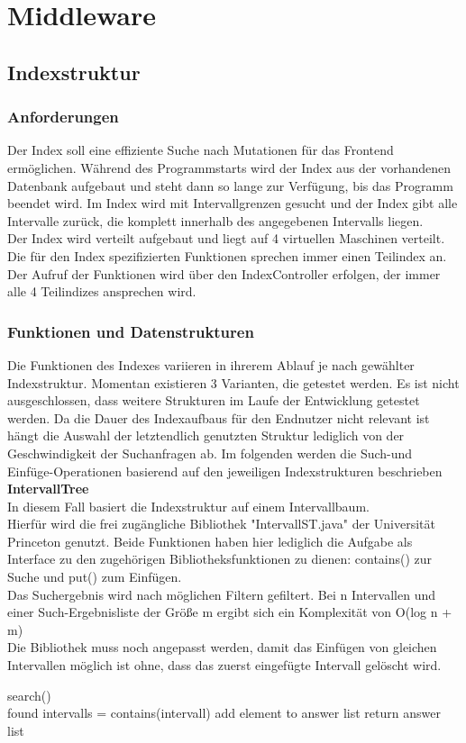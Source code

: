 \section{Middleware}
\subsection{Indexstruktur}

\subsubsection{Anforderungen}
Der Index soll eine effiziente Suche nach Mutationen für das Frontend ermöglichen. Während des Programmstarts wird der Index aus der vorhandenen Datenbank aufgebaut und steht dann so lange zur Verfügung, bis das Programm beendet wird.
Im Index wird mit Intervallgrenzen gesucht und der Index gibt alle Intervalle zurück, die komplett innerhalb des angegebenen Intervalls liegen.\\
Der Index wird verteilt aufgebaut und liegt auf 4 virtuellen Maschinen verteilt. Die für den Index spezifizierten Funktionen sprechen immer einen Teilindex an. Der Aufruf der Funktionen wird über den IndexController erfolgen, der immer alle 4 Teilindizes ansprechen wird.
\subsubsection{Funktionen und Datenstrukturen}
Die Funktionen des Indexes variieren in ihrerem Ablauf je nach gewählter Indexstruktur. Momentan existieren 3 Varianten, die getestet werden. Es ist nicht ausgeschlossen, dass weitere Strukturen im Laufe der Entwicklung getestet werden. Da die Dauer des Indexaufbaus für den Endnutzer nicht relevant ist hängt die Auswahl der letztendlich genutzten Struktur lediglich von der Geschwindigkeit der Suchanfragen ab.
Im folgenden werden die Such-und Einfüge-Operationen basierend auf den jeweiligen Indexstrukturen beschrieben
\newpage
\hfill\\
\textbf{IntervallTree}\\
In diesem Fall basiert die Indexstruktur auf einem Intervallbaum.\\
Hierfür wird die frei zugängliche Bibliothek "IntervallST.java" der Universität Princeton genutzt. Beide Funktionen haben hier lediglich die Aufgabe als Interface zu den zugehörigen Bibliotheksfunktionen zu dienen: contains() zur Suche und put() zum Einfügen.\\
Das Suchergebnis wird nach möglichen Filtern gefiltert. Bei n Intervallen und einer Such-Ergebnisliste der Größe m ergibt sich ein Komplexität von O(log n + m)\\ Die Bibliothek muss noch angepasst werden, damit das Einfügen von gleichen Intervallen möglich ist ohne, dass das zuerst eingefügte Intervall gelöscht wird.
\begin{algorithm}
search()\\{
found intervalls = contains(intervall)\;
{
{
{add element to answer list\;}
}
return answer list\;
}
}
\end{algorithm}


